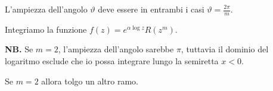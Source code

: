 L'ampiezza dell'angolo $\vartheta $ deve essere in entrambi i casi $\vartheta = \frac{2\pi}{m}$.



Integriamo la funzione $f(z) = e^{\alpha \log z} R\left(z^{m}\right)$.

\textbf{NB.} Se $m = 2$, l'ampiezza dell'angolo sarebbe $\pi $, tuttavia il dominio del logaritmo esclude che io possa integrare lungo la semiretta $x < 0$.

Se $m = 2$ allora tolgo un altro ramo.


\begin{figure}[htpb]
	\centering
{} %

\begin{tikzpicture}[x = 0.75pt, y = 0.75pt, yscale = -1, xscale = 1]


\end{tikzpicture}
\end{figure}
